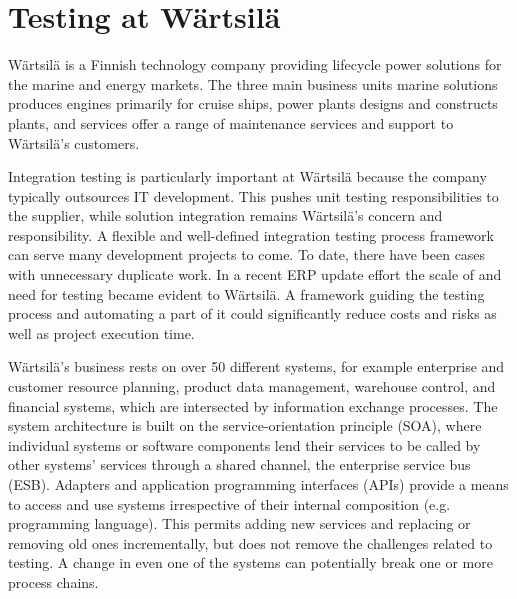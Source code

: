 \documentclass[12pt,a4paper,oneside,pdftex]{report}
\begin{document}
\section{Testing at Wärtsilä}

Wärtsilä is a Finnish technology company providing lifecycle power solutions for the marine and energy markets. The three main business units marine solutions produces engines primarily for cruise ships, power plants designs and constructs plants, and services offer a range of maintenance services and support to Wärtsilä's customers. \citep{wartsila2013web}


Integration testing is particularly important at Wärtsilä because the company typically outsources IT development. This pushes unit testing responsibilities to the supplier, while solution integration remains Wärtsilä's concern and responsibility. A flexible and well-defined integration testing process framework can serve many development projects to come. To date, there have been cases with unnecessary duplicate work. In a recent ERP update effort the scale of and need for testing became evident to Wärtsilä. A framework guiding the testing process and automating a part of it could significantly reduce costs and risks as well as project execution time.

Wärtsilä's business rests on over 50 different systems, for example enterprise and customer resource planning, product data management, warehouse control, and financial systems, which are intersected by information exchange processes. The system architecture is built on the service-orientation principle (SOA), where individual systems or software components lend their services to be called by other systems' services through a shared channel, the enterprise service bus (ESB). Adapters and application programming interfaces (APIs) provide a means to access and use systems irrespective of their internal composition (e.g. programming language). This permits adding new services and replacing or removing old ones incrementally, but does not remove the challenges related to testing. A change in even one of the systems can potentially break one or more process chains. 
\end{document}
